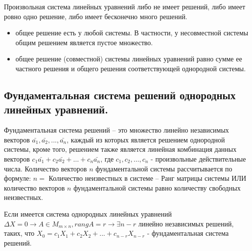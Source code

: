 \documentclass[a4paper,14pt]{article}
\begin{document}
\begin{corollary}
	Произвольная система линейных уравнений либо не имеет решений, либо имеет ровно одно решение, либо имеет бесконечно много решений.
\end{corollary}
\begin{remark} \leavevmode
	\begin{itemize}
		\item общее решение есть у любой системы. В частности, у несовместной системы общим решением является пустое множество.
		\item общее решение (совместной) системы линейных уравнений равно сумме ее частного решения и общего решения соответствующей однородной системы.
	\end{itemize}
\end{remark}
\subsection{Фундаментальная система решений однородных линейных уравнений.}
Фундаментальная система решений – это множество линейно независимых векторов $\bar{a_1}, \bar{a_2}, ..., \bar{a_n}$, каждый из которых является решением однородной системы, кроме того, решением также является линейная комбинация данных векторов $c_1\bar{a_1}+c_2\bar{a_2}+\ldots+c_n\bar{a_n}$, где $c_1,c_2,\dots,c_n$ - произвольные действительные числа. 
Количество векторов $n$ фундаментальной системы рассчитывается по формуле: $n=$ Количество неизвестных в системе – Ранг матрицы системы ИЛИ количество векторов $n$ фундаментальной системы равно количеству свободных неизвестных.
\begin{theorem}
	Если имеется система однородных линейных уравнений $\Delta X = 0 \rightarrow A \in M_{m \times n}, rang A = r \rightarrow \exists n - r$ линейно независимых решений, таких, что $X_0 = c_1X_1 + c_2X_2 + ... + c_{n-r}X_{n-r}$ - фундаментальная система решений.
\end{theorem}
\end{document}
